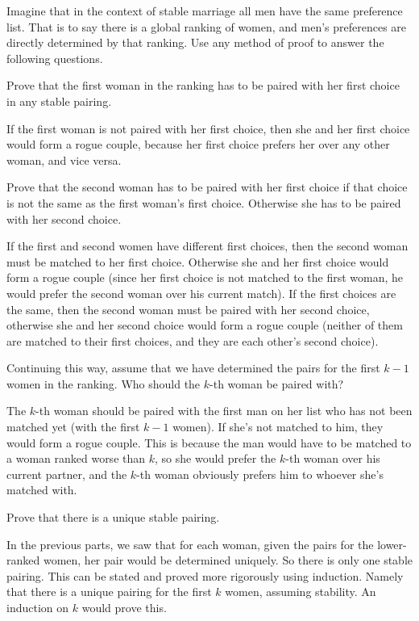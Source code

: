 \question Imagine that in the context of stable marriage all 
men have the same preference list. That is to say there is a 
global ranking of women, and men's preferences are directly 
determined by that ranking.
Use any method of proof to answer the following questions.

\begin{questions}
\item Prove that the first woman in the ranking has to be paired with 
her first choice in any stable pairing.
\begin{solution} [1.2 in]
 If the first woman is not paired with her first choice, then she and 
 her first choice would form a rogue couple, because her first choice 
 prefers her over any other woman, and vice versa.
\end{solution}

\item Prove that the second woman has to be paired with her first 
choice if that choice is not the same as the first woman's first choice. 
Otherwise she has to be paired with her second choice.
\begin{solution}[1.2 in]
If the first and second women have different first choices, then the 
second woman must be matched to her first choice. Otherwise she and her 
first choice would form a rogue couple (since her first choice is not 
matched to the first woman, he would prefer the second woman over his 
current match).
If the first choices are the same, then the second woman must be paired 
with her second choice, otherwise she and her second choice would form 
a rogue couple (neither of them are matched to their first choices, 
and they are each other's second choice).
\end{solution}

\item Continuing this way, assume that we have determined the pairs 
for the first $k-1$ women in the ranking. Who should the $k$-th woman 
be paired with?
\begin{solution}[1.2 in]
The $k$-th woman should be paired with the first man on her list who 
has not been matched yet (with the first $k-1$ women). If she's not 
matched to him, they would form a rogue couple. This is because the 
man would have to be matched to a woman ranked worse than $k$, so she 
would prefer the $k$-th woman over his current partner, and the $k$-th 
woman obviously prefers him to whoever she's matched with.
\end{solution}

\item  Prove that there is a unique stable pairing.
\begin{solution}
In the previous parts, we saw that for each woman, given the pairs 
for the lower-ranked women, her pair would be determined uniquely. So 
there is only one stable pairing.
This can be stated and proved more rigorously using induction. Namely 
that there is a unique pairing for the first $k$ women, assuming 
stability. An induction on $k$ would prove this.
\end{solution}
\end{questions}